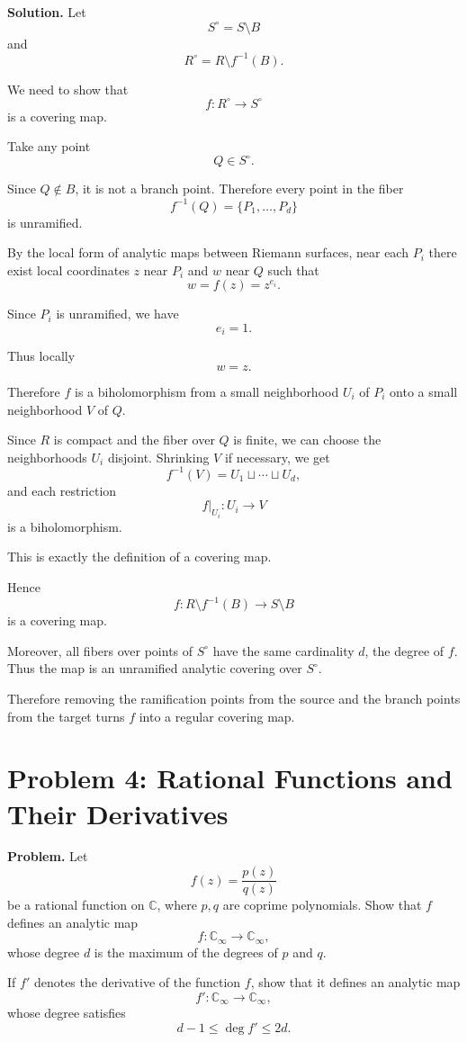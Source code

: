 \documentclass[12pt,a4paper]{article}
\theoremstyle{notespace}
\begin{document}
\textbf{Solution.}
Let
\[
S^\circ=S\setminus B
\]
and
\[
R^\circ=R\setminus f^{-1}(B).
\]

We need to show that
\[
f:R^\circ\to S^\circ
\]
is a covering map.

Take any point
\[
Q\in S^\circ.
\]

Since \(Q\notin B\), it is not a branch point. Therefore every point in the fiber
\[
f^{-1}(Q)=\{P_1,\dots,P_d\}
\]
is unramified.

By the local form of analytic maps between Riemann surfaces, near each \(P_i\) there exist local coordinates \(z\) near \(P_i\) and \(w\) near \(Q\) such that
\[
w=f(z)=z^{e_i}.
\]

Since \(P_i\) is unramified, we have
\[
e_i=1.
\]

Thus locally
\[
w=z.
\]

Therefore \(f\) is a biholomorphism from a small neighborhood \(U_i\) of \(P_i\) onto a small neighborhood \(V\) of \(Q\).

Since \(R\) is compact and the fiber over \(Q\) is finite, we can choose the neighborhoods \(U_i\) disjoint. Shrinking \(V\) if necessary, we get
\[
f^{-1}(V)=U_1\sqcup\cdots\sqcup U_d,
\]
and each restriction
\[
f|_{U_i}:U_i\to V
\]
is a biholomorphism.

This is exactly the definition of a covering map.

Hence
\[
f:R\setminus f^{-1}(B)\to S\setminus B
\]
is a covering map.

Moreover, all fibers over points of \(S^\circ\) have the same cardinality \(d\), the degree of \(f\). Thus the map is an unramified analytic covering over \(S^\circ\).

Therefore removing the ramification points from the source and the branch points from the target turns \(f\) into a regular covering map.

\section{Problem 4: Rational Functions and Their Derivatives}

\textbf{Problem.}
Let
\[
f(z)=\frac{p(z)}{q(z)}
\]
be a rational function on \(\mathbb C\), where \(p,q\) are coprime polynomials. Show that \(f\) defines an analytic map
\[
f:\mathbb C_\infty\to\mathbb C_\infty,
\]
whose degree \(d\) is the maximum of the degrees of \(p\) and \(q\).

If \(f'\) denotes the derivative of the function \(f\), show that it defines an analytic map
\[
f':\mathbb C_\infty\to\mathbb C_\infty,
\]
whose degree satisfies
\[
d-1\leq \deg f'\leq 2d.
\]
\end{document}
